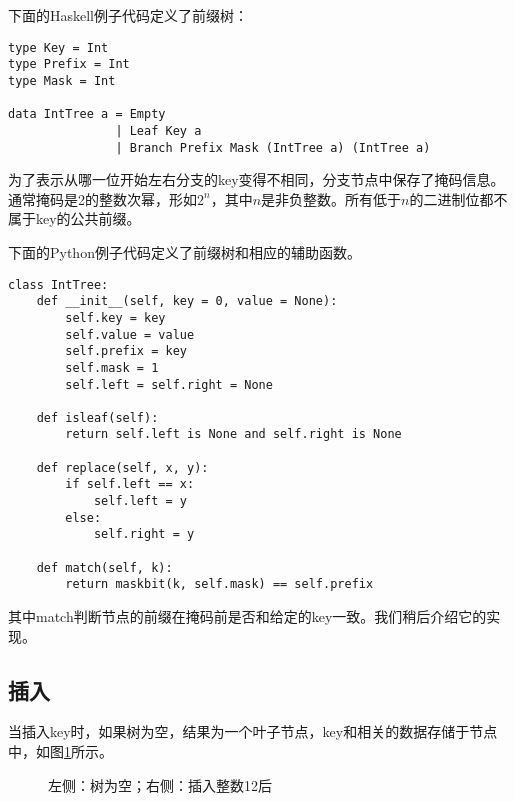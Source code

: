 \documentclass[UTF8]{article}
\begin{document}
下面的Haskell例子代码定义了前缀树：

\lstset{language=Haskell}
\begin{lstlisting}[style=Haskell]
type Key = Int
type Prefix = Int
type Mask = Int

data IntTree a = Empty
               | Leaf Key a
               | Branch Prefix Mask (IntTree a) (IntTree a)
\end{lstlisting}

为了表示从哪一位开始左右分支的key变得不相同，分支节点中保存了掩码信息。通常掩码是2的整数次幂，形如$2^n$，其中$n$是非负整数。所有低于$n$的二进制位都不属于key的公共前缀。

下面的Python例子代码定义了前缀树和相应的辅助函数。

\lstset{language=Python}
\begin{lstlisting}
class IntTree:
    def __init__(self, key = 0, value = None):
        self.key = key
        self.value = value
        self.prefix = key
        self.mask = 1
        self.left = self.right = None

    def isleaf(self):
        return self.left is None and self.right is None

    def replace(self, x, y):
        if self.left == x:
            self.left = y
        else:
            self.right = y

    def match(self, k):
        return maskbit(k, self.mask) == self.prefix
\end{lstlisting}

其中match判断节点的前缀在掩码前是否和给定的key一致。我们稍后介绍它的实现。

\subsection{插入}
当插入key时，如果树为空，结果为一个叶子节点，key和相关的数据存储于节点中，如图\ref{fig:int-patricia-insert-a}所示。

\begin{figure}[htbp]
  \centering
  \caption{左侧：树为空；右侧：插入整数12后}
  \label{fig:int-patricia-insert-a}
\end{figure}
\end{document}
